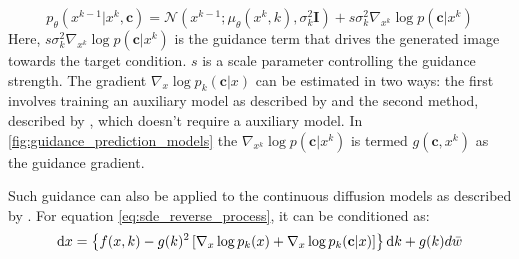 \begin{equation} \label{eq:guid_reverse_process}
    p_\theta(x^{k-1} | x^k, \mathbf{c}) = \mathcal{N} (x^{k-1}; \mu_\theta(x^k, k), \sigma^2_k \mathbf{I}) + s\sigma^2_k\nabla_{x^k} \log p(\mathbf{c}|x^k) 
\end{equation}
Here, $s\sigma^2_k\nabla_{x^k} \log p(\mathbf{c}|x^k)$ is the guidance term that drives the generated image towards the target condition. $s$ is a scale parameter controlling the guidance strength. The gradient $\nabla_x \log{p_k(\mathbf{c} | x)}$ can be estimated in two ways: the first involves training an auxiliary model as described by \cite{luo_understanding_2022} and the second method, described by \textcite{song_score-based_2021, luo_understanding_2022}, which doesn't require a auxiliary model. In \autoref{fig:guidance_prediction_models} the $\nabla_{x^k} \log p(\mathbf{c}|x^k)$ is termed $g(\mathbf{c}, x^k)$ as the guidance gradient.

Such guidance can also be applied to the continuous diffusion models as described by \textcite{song_score-based_2021}. For equation \eqref{eq:sde_reverse_process}, it can be conditioned as:
\begin{equation}
    \mathrm{d} x = \left\{ f(x, k) - g(k)^2 \left[ \nabla_x \log{p_k(x)} + \nabla_x \log{p_k(\mathbf{c} | x)}  \right] \right\} \mathrm{d} k + g(k)d\bar{w}
\end{equation}

